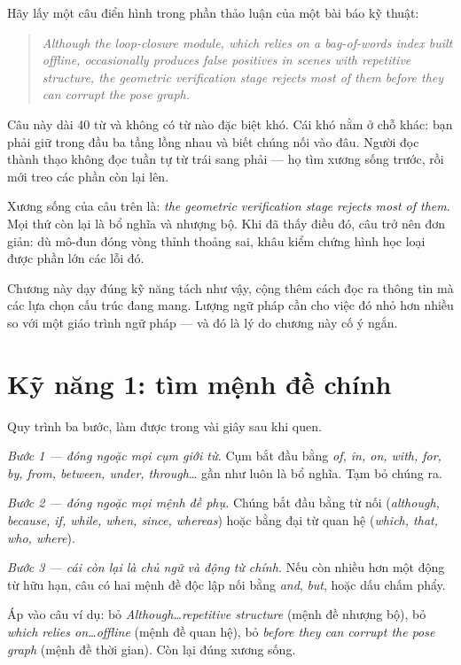 \documentclass[../../english.tex]{subfiles}
\begin{document}
Hãy lấy một câu điển hình trong phần thảo luận của một bài báo kỹ thuật:

\begin{quote}
\emph{Although the loop-closure module, which relies on a bag-of-words index built offline, occasionally produces false positives in scenes with repetitive structure, the geometric verification stage rejects most of them before they can corrupt the pose graph.}
\end{quote}

Câu này dài 40 từ và không có từ nào đặc biệt khó. Cái khó nằm ở chỗ khác: bạn phải giữ trong đầu ba tầng lồng nhau và biết chúng nối vào đâu. Người đọc thành thạo không đọc tuần tự từ trái sang phải --- họ tìm xương sống trước, rồi mới treo các phần còn lại lên.

Xương sống của câu trên là: \emph{the geometric verification stage rejects most of them}. Mọi thứ còn lại là bổ nghĩa và nhượng bộ. Khi đã thấy điều đó, câu trở nên đơn giản: dù mô-đun đóng vòng thỉnh thoảng sai, khâu kiểm chứng hình học loại được phần lớn các lỗi đó.

Chương này dạy đúng kỹ năng tách như vậy, cộng thêm cách đọc ra thông tin mà các lựa chọn cấu trúc đang mang. Lượng ngữ pháp cần cho việc đó nhỏ hơn nhiều so với một giáo trình ngữ pháp --- và đó là lý do chương này cố ý ngắn.

\section{Kỹ năng 1: tìm mệnh đề chính}

Quy trình ba bước, làm được trong vài giây sau khi quen.

\emph{Bước 1 --- đóng ngoặc mọi cụm giới từ.} Cụm bắt đầu bằng \emph{of, in, on, with, for, by, from, between, under, through}\ldots{} gần như luôn là bổ nghĩa. Tạm bỏ chúng ra.

\emph{Bước 2 --- đóng ngoặc mọi mệnh đề phụ.} Chúng bắt đầu bằng từ nối (\emph{although, because, if, while, when, since, whereas}) hoặc bằng đại từ quan hệ (\emph{which, that, who, where}).

\emph{Bước 3 --- cái còn lại là chủ ngữ và động từ chính.} Nếu còn nhiều hơn một động từ hữu hạn, câu có hai mệnh đề độc lập nối bằng \emph{and}, \emph{but}, hoặc dấu chấm phẩy.

Áp vào câu ví dụ: bỏ \emph{Although\ldots repetitive structure} (mệnh đề nhượng bộ), bỏ \emph{which relies on\ldots offline} (mệnh đề quan hệ), bỏ \emph{before they can corrupt the pose graph} (mệnh đề thời gian). Còn lại đúng xương sống.
\end{document}
